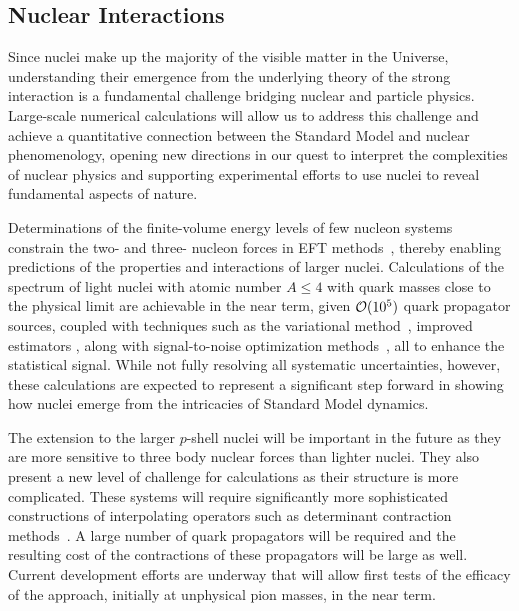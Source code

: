 \subsection{Nuclear Interactions}

Since nuclei make up the majority of the visible matter in the Universe, understanding their emergence from the underlying theory of the strong interaction is a fundamental challenge bridging nuclear and particle physics. Large-scale numerical calculations will allow us to address this challenge and achieve a quantitative connection between the Standard Model and nuclear phenomenology, opening new directions in our quest to interpret the complexities of nuclear physics and supporting experimental efforts to use nuclei to reveal fundamental aspects of nature.

Determinations of the finite-volume energy levels of few nucleon systems constrain the two- and three- nucleon forces in EFT methods~\cite{Barnea:2013uqa}, thereby enabling predictions of the properties and interactions of larger nuclei. Calculations of the spectrum of light nuclei with atomic number $A\le 4$ with quark masses close to the physical limit are achievable in the near term, given ${\cal O}(10^5)$ quark propagator sources, coupled with techniques such as the variational method~\cite{Michael:1985ne}, improved estimators \cite{Beane:2014oea}, along with signal-to-noise optimization methods~\cite{Detmold:2014hla}, all to enhance the statistical signal. While not fully resolving all systematic uncertainties, however, these calculations are expected to represent a significant step forward in showing how nuclei emerge from the intricacies of Standard Model dynamics.

The extension to the larger $p$-shell nuclei will be important in the future as they are more sensitive to three body nuclear forces than lighter nuclei. They also present a new level of challenge for calculations as their structure is more complicated. These systems will require significantly more sophisticated constructions of interpolating operators such as determinant contraction methods~\cite{Detmold:2012eu,Vachaspati:2014bda}. A large number of quark propagators will be required and the resulting cost of the contractions of these propagators will be large as well. Current development efforts are underway that will allow  first tests of the efficacy of the approach, initially at unphysical pion masses, in the near term.

